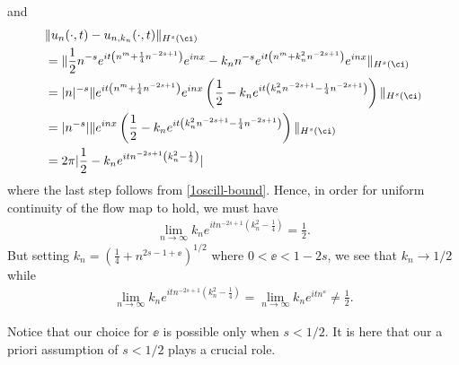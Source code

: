 %
%
and
%
%
\begin{equation*}
	\begin{split}
		& \|u_{n}(\cdot, t) - u_{n, k_{n}}(\cdot, t) \|_{H^{s}(\ci)}
		\\
		& = \|\frac{1}{2}n^{-s}e^{it\left( n^{m} + \frac{1}{4}n^{-2s+1}
		\right)}e^{inx} - k_{n}n^{-s}e^{it\left( n^{m} + k_{n}^{2}n^{-2s+1}
		\right)}e^{inx} \|_{H^{s}(\ci)}
		\\
		& = | n |^{-s} \|e^{it\left( n^{m} + \frac{1}{4}n^{-2s+1}
		\right)}e^{inx}\left( \frac{1}{2} - k_{n}e^{it\left(
		k_{n}^{2}n^{-2s+1}-\frac{1}{4}n^{-2s+1} \right)} \right)\|_{H^{s}(\ci)}
		\\
		& = | n^{-s} |\|e^{inx}\left( \frac{1}{2} - k_{n}e^{it\left(
		k_{n}^{2}n^{-2s+1} - \frac{1}{4}n^{-2s+1}
		\right)} \right) \|_{H^{s}(\ci)}
		\\
		& = 2 \pi
    | \frac{1}{2} - k_{n}e^{itn^{-2s+1}\left( k_{n}^{2}- \frac{1}{4}\right)} |
	\end{split}
\end{equation*}
%
%
where the last step follows from \eqref{1oscill-bound}. Hence, in order for uniform continuity of the flow map to hold, we must have
%
%
\begin{equation*}
	\begin{split}
		\lim_{n \to \infty}  k_{n} e^{itn^{-2s+1}\left( k_{n}^{2} -
		\frac{1}{4} \right)}  = \frac{1}{2}.
	\end{split}
\end{equation*}
%
%
But setting $k_{n} = \left( \frac{1}{4} + n^{2s-1 + \ee} \right)^{1/2}$ where
$0 < \ee < 1-2s$, we see that $k_n \to 1/2$ while
%
%
\begin{equation*}
	\begin{split}
		\lim_{n \to \infty} k_{n} e^{itn^{-2s+1}\left( k_{n}^{2} - \frac{1}{4}
		\right)} = \lim_{n \to \infty} k_{n} e^{itn^{\ee}} \neq \frac{1}{2}.
	\end{split}
\end{equation*}
%
\begin{framed}
\begin{remark}
	Notice that our choice for $\ee$ is possible only when $s < 1/2$.
	It is here that
	our a priori assumption of $s < 1/2$ plays a crucial role.
\end{remark}
\end{framed}

